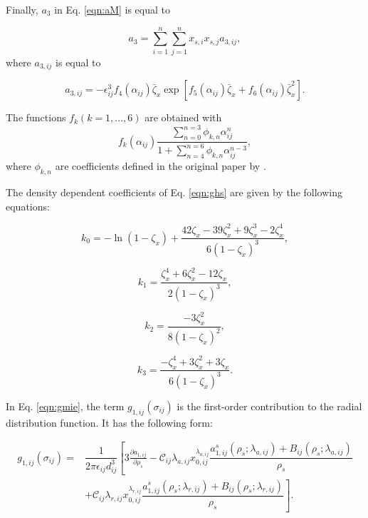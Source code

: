 Finally, $a_{3}$  in Eq. \ref{eqn:aM} is equal to

\begin{equation}
a_{3} = \sum_{i=1}^{n} \sum_{j=1}^{n} x_{s,i} x_{s,j} a_{3,ij},
\end{equation}	
where $a_{3,ij}$ is equal to

\begin{equation}
a_{3,ij} = - \epsilon _{ij}^{3} f_{4}(\alpha_{ij}) \bar{\zeta}_{x} \exp[f_{5}(\alpha_{ij}) \bar{\zeta}_{x}+ f_{6}(\alpha_{ij}) \bar{\zeta}_{x}^{2}].
\end{equation}

The functions $f_{k}(k=1,...,6)$ are obtained with
\begin{equation}
f_{k}(\alpha_{ij}) \dfrac{\sum_{n=0}^{n=3} \phi_{k,n} \alpha_{ij}^{n}}{1+ \sum_{n=4}^{n=6} \phi_{k,n} \alpha_{ij}^{n-3}},
\end{equation}
where $\phi_{k,n}$ are coefficients defined in the original paper by .

The density dependent coefficients of Eq. \ref{eqn:ghs} are given by the following equations:

\begin{equation}
k_{0} = - \ln(1-{\zeta}_{x}) + \frac{42{\zeta}_{x} -39{\zeta}_{x}^{2}+ 9{\zeta}_{x}^{3}-2{\zeta}_{x}^{4}}{6(1-\zeta_{x})^{3}},
\end{equation}

\begin{equation}
k_{1} = \frac{{\zeta}_{x}^{4} +6{\zeta}_{x}^{2}- 12{\zeta}_{x}}{2(1-\zeta_{x})^{3}},
\end{equation}

\begin{equation}
k_{2} = \frac{-3{\zeta}_{x}^{2}}{8(1-\zeta_{x})^{2}},
\end{equation}

\begin{equation}
k_{3} = \frac{-{\zeta}_{x}^{4}+3{\zeta}_{x}^{2}+3{\zeta}_{x}}{6(1-\zeta_{x})^{3}}.
\end{equation}

In Eq. \ref{eqn:gmie}, the term $g_{1,ij}(\sigma_{ij})$ is the first-order contribution to the radial distribution function. It has the following form:

\begin{equation}
\begin{aligned}
g_{1,ij}(\sigma_{ij}) {}=& \dfrac{1}{2 \pi \epsilon_{ij} d _{ij}^{3}} \left[ 3 \frac{\partial a_{1,ij}}{\partial \rho _{s}}   - \mathcal{C}_{ij} \lambda_{a,ij} x_{0,ij}^{\lambda_{a,ij}} \dfrac{a_{1,ij}^{s}(\rho_{s};\lambda_{a,ij})+B_{ij}(\rho_{s};\lambda_{a,ij})}{\rho _{s}} \right. \\
& \left.  + \mathcal{C}_{ij} \lambda_{r,ij} x_{0,ij}^{\lambda_{r,ij}} \dfrac{a_{1,ij}^{s}(\rho_{s};\lambda_{r,ij})+B_{ij}(\rho_{s};\lambda_{r,ij})}{\rho _{s}} \right].
\end{aligned}
\label{eq:g1saft}
\end{equation} 

